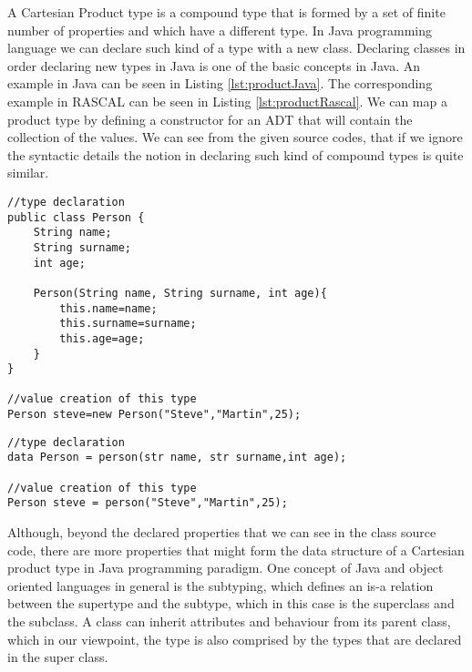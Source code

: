A Cartesian Product type is a compound type that is formed by a set of finite number of properties and which have a different type. In Java programming language we can declare such kind of a type with a new class. Declaring classes in order declaring new types in Java is one of the basic concepts in Java. An example in Java can be seen in Listing \ref{lst:productJava}. The corresponding example in RASCAL can be seen in Listing \ref{lst:productRascal}. We can map a product type by defining a constructor for an ADT that will contain the collection of the values.  We can see from the given source codes, that if we ignore the syntactic details the notion in declaring such kind of compound types is quite similar. 

\begin{lstlisting}[label=lst:productJava,caption=Declaration example of a Cartesian Product type in Java.]
//type declaration
public class Person {
	String name;
	String surname;
	int age;
	
	Person(String name, String surname, int age){
		this.name=name;
		this.surname=surname;
		this.age=age;
	}
}

//value creation of this type
Person steve=new Person("Steve","Martin",25);
\end{lstlisting}

\begin{lstlisting}[label=lst:productRascal,caption=Mapping example of a Cartesian Product type in RASCAL.]
//type declaration
data Person = person(str name, str surname,int age);

//value creation of this type
Person steve = person("Steve","Martin",25);
\end{lstlisting}



Although, beyond the declared properties that we can see in the class source code, there are more properties that might form the data structure of a Cartesian product type in Java programming paradigm. One concept of Java and object oriented languages in general is the subtyping, which defines an is-a relation between the supertype and the subtype, which in this case is the superclass and the subclass. A class can inherit attributes and behaviour from its parent class, which in our viewpoint, the type is also comprised by the types that are declared in the super class.

